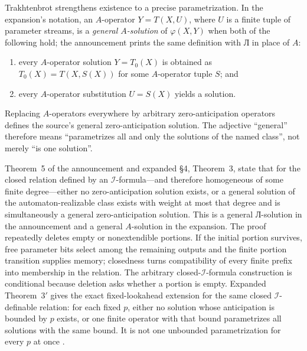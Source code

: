 Trakhtenbrot strengthens existence to a precise parametrization.  In the
expansion's notation, an \(A\)-operator \(Y=T(X,U)\), where \(U\) is a finite
tuple of parameter streams, is a \emph{general \(A\)-solution} of
\(\varphi(X,Y)\) when both of the following hold; the announcement prints the
same definition with Л in place of \(A\):
\begin{enumerate}
\item every \(A\)-operator solution \(Y=T_0(X)\) is obtained as
  \(T_0(X)=T(X,S(X))\) for some \(A\)-operator tuple \(S\); and
\item every \(A\)-operator substitution \(U=S(X)\) yields a solution.
\end{enumerate}
Replacing \(A\)-operators everywhere by arbitrary zero-anticipation operators
defines the source's general zero-anticipation solution.  The adjective
\enquote{general} therefore means
\enquote{parametrizes all and only the solutions of the named class}, not
merely \enquote{is one solution}.

Theorem~5 of the announcement and expanded \S4, Theorem~3, state that for the
closed relation defined by an \(\mathcal I\)-formula---and therefore homogeneous
of some finite degree---either no zero-anticipation solution exists, or a
general solution of the automaton-realizable class exists with weight at most
that degree and is simultaneously a general zero-anticipation solution.  This
is a general Л-solution in the announcement and a general \(A\)-solution in the
expansion.  The proof repeatedly deletes empty or nonextendible portions.  If
the initial portion survives, free parameter bits select among the remaining
outputs and the finite portion transition supplies memory; closedness turns
compatibility of every finite prefix into membership in the relation.  The
arbitrary closed-\(\mathcal I\)-formula construction is conditional because
deletion asks whether a portion is empty.  Expanded Theorem~\(3'\) gives the
exact fixed-lookahead extension for the same closed \(\mathcal I\)-definable
relation: for each fixed \(p\), either no solution whose anticipation is
bounded by \(p\) exists, or one finite operator with that bound parametrizes
all solutions with the same bound.  It is not one unbounded parametrization
for every \(p\) at once
\cite[pp.~328--329]{Trakhtenbrot1961}
\cite[pp.~119--124]{Trakhtenbrot1962Expanded}.

